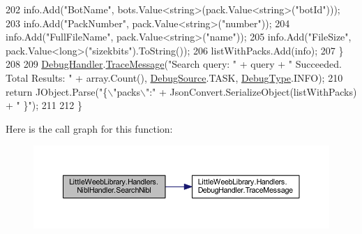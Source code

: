 \begin{DoxyCode}
202                 info.Add(\textcolor{stringliteral}{"BotName"}, bots.Value<\textcolor{keywordtype}{string}>(pack.Value<\textcolor{keywordtype}{string}>(\textcolor{stringliteral}{"botId"})));
203                 info.Add(\textcolor{stringliteral}{"PackNumber"}, pack.Value<\textcolor{keywordtype}{string}>(\textcolor{stringliteral}{"number"}));
204                 info.Add(\textcolor{stringliteral}{"FullFileName"}, pack.Value<\textcolor{keywordtype}{string}>(\textcolor{stringliteral}{"name"}));
205                 info.Add(\textcolor{stringliteral}{"FileSize"}, pack.Value<\textcolor{keywordtype}{long}>(\textcolor{stringliteral}{"sizekbits"}).ToString());
206                 listWithPacks.Add(info);
207             \}
208 
209             \mbox{\hyperlink{class_little_weeb_library_1_1_handlers_1_1_nibl_handler_a334c2111588fa71d1203bd8cbb572970}{DebugHandler}}.\mbox{\hyperlink{interface_little_weeb_library_1_1_handlers_1_1_i_debug_handler_a2e405bc3492e683cd3702fae125221bc}{TraceMessage}}(\textcolor{stringliteral}{"Search query: "} + query + \textcolor{stringliteral}{" Succeeded. Total
       Results: "} + array.Count(), \mbox{\hyperlink{namespace_little_weeb_library_1_1_handlers_a2a6ca0775121c9c503d58aa254d292be}{DebugSource}}.TASK, \mbox{\hyperlink{namespace_little_weeb_library_1_1_handlers_ab66019ed40462876ec4e61bb3ccb0a62}{DebugType}}.INFO);
210             \textcolor{keywordflow}{return} JObject.Parse(\textcolor{stringliteral}{"\{\(\backslash\)"packs\(\backslash\)":"} + JsonConvert.SerializeObject(listWithPacks) + \textcolor{stringliteral}{" \}"});
211 
212         \}
\end{DoxyCode}
Here is the call graph for this function\+:\nopagebreak
\begin{figure}[H]
\begin{center}
\leavevmode
\includegraphics[width=350pt]{class_little_weeb_library_1_1_handlers_1_1_nibl_handler_acffe025c2b1158bc67196879622dfa0a_cgraph}
\end{center}
\end{figure}
\mbox{\label{class_little_weeb_library_1_1_handlers_1_1_nibl_handler_a149bf3305de6348eaddee4afb92d5095}} 
